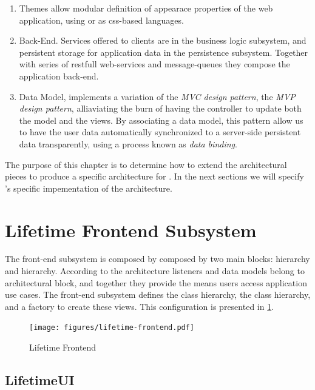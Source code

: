 \begin{enumerate}
\item Themes allow modular definition of appearace properties of the
  web application, using  or  as css-based
  languages.

\item Back-End. Services offered to clients are in the business logic
  subsystem, and persistent storage for application data in the
  persistence subsystem. Together with series of restfull web-services
  and message-queues they compose the application back-end.

\item Data Model, implements a variation of the \emph{MVC design
    pattern}, the \emph{MVP design pattern}, alliaviating the burn of
  having the controller to update both the model and the views. By
  associating a data model, this pattern allow us to have the user
  data automatically synchronized to a server-side persistent data
  transparently, using a process known as \emph{data binding}.

\end{enumerate}
%

%
The purpose of this chapter is to determine how to extend the \vaadin
architectural pieces to produce a specific architecture for
\lifetime. In the next sections we will specify \lifetime's specific
impementation of the \vaadin architecture.
%


\section{Lifetime Frontend Subsystem}
\label{sec:frontend}
The front-end subsystem is composed by composed by two main blocks:
 hierarchy and 
hierarchy. According to the architecture listeners and data models
belong to  architectural block, and together they
provide the means users access application use cases.
%
The front-end subsystem defines the  class hierarchy,
the  class hierarchy, and a factory to create these
views. This configuration is presented in \ref{fig:lifetime-frontend}.
%
\begin{figure}[htpb]
  \centering
  \texttt{[image: figures/lifetime-frontend.pdf]}
  \caption{Lifetime Frontend}
  \label{fig:lifetime-frontend}
\end{figure}
%


%
\subsection{LifetimeUI}
\label{sec:lifetimeui}

